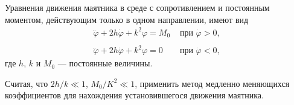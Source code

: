 Уравнения движения маятника в среде с сопротивлением и постоянным моментом,
действующим только в одном направлении, имеют вид
$$
	\begin{array}{ll}
		\ddot{\varphi} + 2h\dot{\varphi} + k^2\varphi = M_0
		&\mbox{ при } \dot{\varphi} > 0, \\
		\\
		\ddot{\varphi} + 2h\dot{\varphi} + k^2\varphi = 0
		&\mbox{ при } \dot{\varphi} < 0,
	\end{array}
$$
где $h$, $k$ и $M_0$ --- постоянные величины.

Считая, что $2h/k \ll 1$, $M_0 /K^2 \ll 1$,
применить метод медленно меняющихся коэффициентов
для нахождения установившегося движения маятника.
